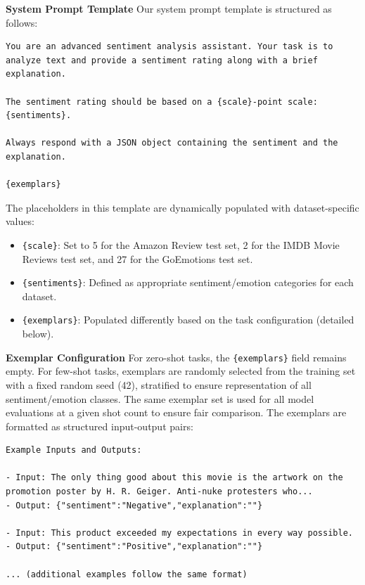\documentclass{IEEEcsmag}
\begin{document}
\noindent\textbf{System Prompt Template}
Our system prompt template is structured as follows:

\begin{verbatim}
You are an advanced sentiment analysis assistant. Your task is to analyze text and provide a sentiment rating along with a brief explanation.

The sentiment rating should be based on a {scale}-point scale: {sentiments}.

Always respond with a JSON object containing the sentiment and the explanation.

{exemplars}
\end{verbatim}

\noindent The placeholders in this template are dynamically populated with dataset-specific values:

\begin{itemize}[itemsep=1pt, topsep=1pt, leftmargin=*]
    \item \texttt{\{scale\}}: Set to 5 for the Amazon Review test set, 2 for the IMDB Movie Reviews test set, and 27 for the GoEmotions test set.
    \item \texttt{\{sentiments\}}: Defined as appropriate sentiment/emotion categories for each dataset.
    \item \texttt{\{exemplars\}}: Populated differently based on the task configuration (detailed below).
\end{itemize}

\noindent\textbf{Exemplar Configuration}
For zero-shot tasks, the \texttt{\{exemplars\}} field remains empty. For few-shot tasks, exemplars are randomly selected from the training set with a fixed random seed (42), stratified to ensure representation of all sentiment/emotion classes. The same exemplar set is used for all model evaluations at a given shot count to ensure fair comparison. The exemplars are formatted as structured input-output pairs:

\begin{verbatim}               
Example Inputs and Outputs:

- Input: The only thing good about this movie is the artwork on the promotion poster by H. R. Geiger. Anti-nuke protesters who...
- Output: {"sentiment":"Negative","explanation":""}

- Input: This product exceeded my expectations in every way possible.
- Output: {"sentiment":"Positive","explanation":""}

... (additional examples follow the same format)
\end{verbatim}
\end{document}
